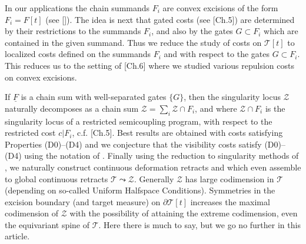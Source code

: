 \documentclass[12pt]{amsart}
\newtheorem{lem}[thm]{Lemma}
\newtheorem*{prob}{Problem}
\theoremstyle{definition}
\theoremstyle{remark}
\newcommand{\del}{\partial}
\newcommand{\uF}{\underline{F}}
\newcommand{\sT}{\mathscr{T}}
\newcommand{\sZ}{\mathscr{Z}}
\begin{document}
In our applications the chain summands $F_i$ are convex excisions of the form $F_i=F[t]$ (see \cite{martel}[]). The idea is next that gated costs (see \cite{martel}[Ch.5]) are determined by their restrictions to the summands $F_i$, and also by the gates $G\subset F_i$ which are contained in the given summand. Thus we reduce the study of costs on $\sT[t]$ to localized costs defined on the summands $F_i$ and with respect to the gates $G\subset F_i$. This reduces us to the setting of \cite{martel}[Ch.6] where we studied various repulsion costs on convex excisions. 

If $\uF$ is a chain sum with well-separated gates $\{G\}$, then the singularity locus $\sZ$ naturally decomposes as a chain sum $\sZ=\sum_i \sZ \cap F_i$, and where $\sZ \cap F_i$ is the singularity locus of a restricted semicoupling program, with respect to the restricted cost $c|F_i$, c.f. \cite{martel}[Ch.5]. Best results are obtained with costs satisfying Properties (D0)--(D4) and we conjecture that the visibility costs satisfy (D0)--(D4) using the notation of \cite{martel}. Finally using the reduction to singularity methods of \cite{martel}, we naturally construct continuous deformation retracts and which even assemble to global continuous retracts $\sT \leadsto \sZ$. Generally $\sZ$ has large codimension in $\sT$ (depending on so-called Uniform Halfspace Conditions). Symmetries in the excision boundary (and target measure) on $\del \sT[t]$ increases the maximal codimension of $\sZ$ with the possibility of attaining the extreme codimension, even the equivariant spine of $\sT$. Here there is much to say, but we go no further in this article.


 





 
\end{document}
